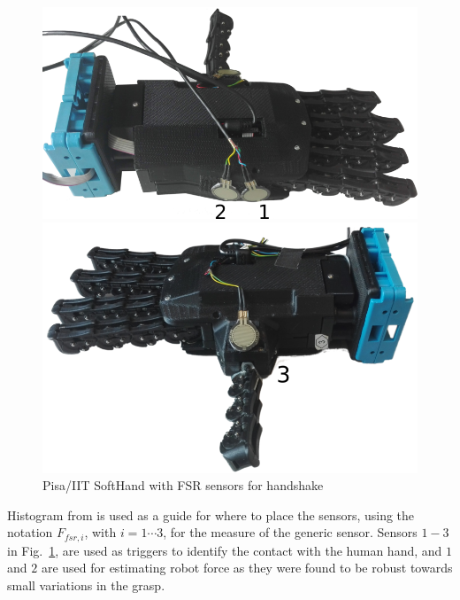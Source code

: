 \begin{figure}[h]
  \centering
  \begin{minipage}[b]{0.45\textwidth}
    \includegraphics[width=\textwidth]{Figure/qbhand2-small.png}
  \end{minipage}
  \hfill
  \begin{minipage}[b]{0.45\textwidth}
    \includegraphics[width=\textwidth]{Figure/qbhand1-small.png}
  \end{minipage}
  \label{fig:sensorsONhand}
  \caption{Pisa/IIT SoftHand with FSR sensors for handshake}
\end{figure}

Histogram from \cite{knoop2017handshakiness} is used as a guide for where to place the sensors, using the notation $F_{fsr,i}$, with $i = 1\cdots 3$, for the measure of the generic sensor. 
%
Sensors $1-3$ in Fig.~\ref{fig:sensorsONhand}, are used as triggers to identify the contact with the human hand, and $1$ and $2$ are used for estimating robot force as they were found to be robust towards small variations in the grasp. 


